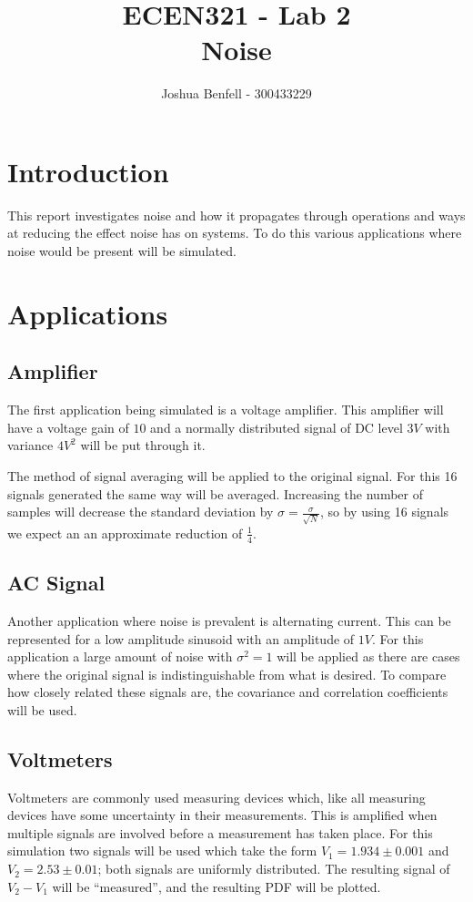 \documentclass[a4paper, 12pt]{article}
\title{ECEN321 - Lab 2 \\
    Noise
}
\author{Joshua Benfell - 300433229}
\begin{document}
	\maketitle
    
    \section{Introduction}

        This report investigates noise and how it propagates through operations and ways at reducing the effect noise has on systems. To do this various applications where noise would be present will be simulated.

    \section{Applications}
        \subsection{Amplifier}
            The first application being simulated is a voltage amplifier. This amplifier will have a voltage gain of $10$ and a normally distributed signal of DC level $3V$ with variance $4 V^2$ will be put through it.
            \par
            The method of signal averaging will be applied to the original signal. For this 16 signals generated the same way will be averaged. Increasing the number of samples will decrease the standard deviation by $\sigma = \frac{\sigma}{\sqrt{N}}$, so by using 16 signals we expect an an approximate reduction of $\frac{1}{4}$. 
        \subsection{AC Signal}
            Another application where noise is prevalent is alternating current. This can be represented for a low amplitude sinusoid with an amplitude of $1V$. For this application a large amount of noise with $\sigma^2 = 1$ will be applied as there are cases where the original signal is indistinguishable from what is desired. To compare how closely related these signals are, the covariance and correlation coefficients will be used.
        \subsection{Voltmeters}
            Voltmeters are commonly used measuring devices which, like all measuring devices have some uncertainty in their measurements. This is amplified when multiple signals are involved before a measurement has taken place. For this simulation two signals will be used which take the form $V_1 = 1.934 \pm 0.001$ and $V_2 = 2.53 \pm 0.01$; both signals are uniformly distributed. The resulting signal of $V_2 - V_1$ will be ``measured'', and the resulting PDF will be plotted.
\end{document}
